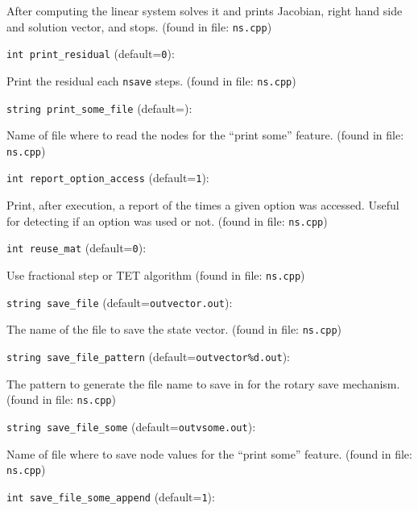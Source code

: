 After computing the linear system solves it and prints Jacobian,
right hand side and solution vector, and stops. 
 (found in file: \verb+ns.cpp+)
\item\verb+int print_residual+ {\rm(default=\verb|0|)}:

Print the residual each  \verb+nsave+  steps. 
 (found in file: \verb+ns.cpp+)
\item\verb+string print_some_file+ {\rm(default=\verb||)}:

Name of file where to read the nodes for the ``print some'' 
feature. 
 (found in file: \verb+ns.cpp+)
\item\verb+int report_option_access+ {\rm(default=\verb|1|)}:

Print, after execution, a report of the times a given option
was accessed. Useful for detecting if an option was used or not.
 (found in file: \verb+ns.cpp+)
\item\verb+int reuse_mat+ {\rm(default=\verb|0|)}:

Use fractional step or TET algorithm
 (found in file: \verb+ns.cpp+)
\item\verb+string save_file+ {\rm(default=\verb|outvector.out|)}:

The name of the file to save the state vector. 
 (found in file: \verb+ns.cpp+)
\item\verb+string save_file_pattern+ {\rm(default=\verb|outvector%d.out|)}:

The pattern to generate the file name to save in for
the rotary save mechanism.
 (found in file: \verb+ns.cpp+)
\item\verb+string save_file_some+ {\rm(default=\verb|outvsome.out|)}:

Name of file where to save node values for the ``print some'' 
feature. 
 (found in file: \verb+ns.cpp+)
\item\verb+int save_file_some_append+ {\rm(default=\verb|1|)}:


